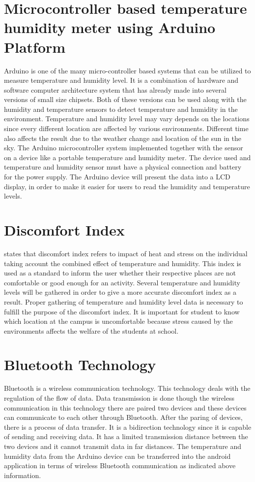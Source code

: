 
\section{Microcontroller based temperature humidity meter using Arduino Platform}
Arduino is one of the many micro-controller based systems that can be utilized to measure temperature and humidity level. It is a combination of hardware and software computer architecture system that has already made into several versions of small size chipsets. Both of these versions can be used along with the humidity and temperature sensors to detect temperature and humidity in the environment. Temperature and humidity level may vary depends on the locations since every different location are affected by various environments. Different time also affects the result due to the weather change and location of the sun in the sky. 
The Arduino microcontroller system implemented together with the sensor on a device like a portable temperature and humidity meter. The device used and temperature and humidity sensor must have a physical connection and battery for the power supply. The Arduino device will present the data into a LCD display, in order to make it easier for users to read the humidity and temperature levels.

\section{Discomfort Index}
\cite{Discomfort} states that discomfort index refers to impact of heat and stress on the individual taking account the combined effect of temperature and humidity. This index is used as a standard to inform the user whether their respective places are not comfortable or good enough for an activity. Several temperature and humidity levels will be gathered in order to give a more accurate discomfort index as a result. Proper gathering of temperature and humidity level data is necessary to fulfill the purpose of the discomfort index. It is important for student to know which location at the campus is uncomfortable because stress caused by the environments affects the welfare of the students at school.  

\section{Bluetooth Technology}
Bluetooth is a wireless communication technology. This technology deals with the regulation of the flow of data. Data transmission is done though the wireless communication in this technology there are paired two devices and these devices can communicate to each other through Bluetooth. After the paring of devices, there is a process of data transfer. It is a bidirection technology since it is capable of sending and receiving data. It has a limited transmission distance between the two devices and it cannot transmit data in far distances. The temperature and humidity data from the Arduino device can be transferred into the android application in terms of wireless Bluetooth communication as indicated above information.

